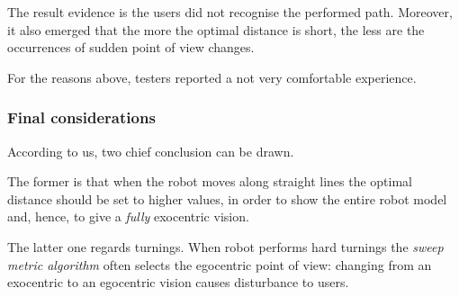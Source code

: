 The result evidence is the users did not recognise the performed path.
Moreover, it also emerged that the more the optimal distance is short,
the less are the occurrences of sudden point of view changes.
%

%
For the reasons above, testers reported a not very comfortable experience.


\subsubsection{Final considerations}
\label{subsubsec:finalconsiderations}

According to us, two chief conclusion can be drawn.
%

%
The former is that when the robot moves along straight lines
the optimal distance should be set to higher values, in order
to show the entire robot model and, hence, to give a \textit{fully}
exocentric vision.
%

%
The latter one regards turnings. When robot performs hard turnings
the \textit{sweep metric algorithm} often selects the egocentric
point of view: changing from an exocentric to an egocentric vision
causes disturbance to users.
